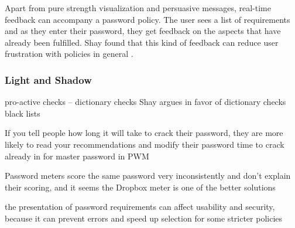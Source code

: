 	
	Apart from pure strength visualization and persuasive messages, real-time feedback can accompany a password policy. The user sees a list of requirements and as they enter their password, they get feedback on the aspects that have already been fulfilled. Shay \etal found that this kind of feedback can reduce user frustration with policies in general \cite{Shay2015SpoonfulOfSugar}. 

	
	\subsubsection{Light and Shadow}
	
	
	
	pro-active checks -- dictionary checks Shay argues in favor of dictionary checks \cite{Shay2014CanLongPasswordsBeSecureAndUsable} 
	black lists \cite{Habib2017Blacklists} 
	
	
	
	
	
	
	

	
	If you tell people how long it will take to crack their password, they are more likely to read your recommendations and modify their password \cite{Vance2013FearAppeals} time to crack already in \cite{Yee2006Passpet} for master password in PWM
	
	Password meters score the same password very inconsistently and don't explain their scoring, and it seems the Dropbox meter is one of the better solutions \cite{Carnavalet2014AnalyzingPWStrengthMeters}
	
	the presentation of password requirements can affect usability and security, because it can prevent errors and speed up selection for some stricter policies \cite{Shay2015SpoonfulOfSugar}
	
	
	
